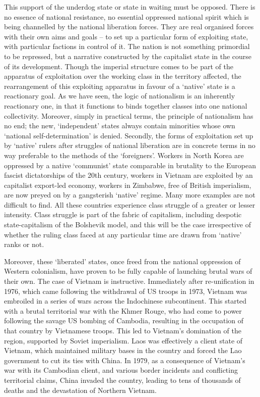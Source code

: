 This support of the underdog state or state in waiting must be opposed. There is no essence of national resistance, no essential oppressed national spirit which is being channelled by the national liberation forces. They are real organised forces with their own aims and goals – to set up a particular form of exploiting state, with particular factions in control of it. The nation is not something primordial to be repressed, but a narrative constructed by the capitalist state in the course of its development. Though the imperial structure comes to be part of the apparatus of exploitation over the working class in the territory affected, the rearrangement of this exploiting apparatus in favour of a ‘native’ state is a reactionary goal. As we have seen, the logic of nationalism is an inherently reactionary one, in that it functions to binds together classes into one national collectivity. Moreover, simply in practical terms, the principle of nationalism has no end; the new, ‘independent’ states always contain minorities whose own ‘national self-determination’ is denied. Secondly, the forms of exploitation set up by ‘native’ rulers after struggles of national liberation are in concrete terms in no way preferable to the methods of the ‘foreigners’. Workers in North Korea are oppressed by a native ‘communist’ state comparable in brutality to the European fascist dictatorships of the 20th century, workers in Vietnam are exploited by an capitalist export-led economy, workers in Zimbabwe, free of British imperialism, are now preyed on by a gangsterish ‘native’ regime. Many more examples are not difficult to find. All these countries experience class struggle of a greater or lesser intensity. Class struggle is part of the fabric of capitalism, including despotic state-capitalism of the Bolshevik model, and this will be the case irrespective of whether the ruling class faced at any particular time are drawn from ‘native’ ranks or not.

Moreover, these ‘liberated’ states, once freed from the national oppression of Western colonialism, have proven to be fully capable of launching brutal wars of their own. The case of Vietnam is instructive. Immediately after re-unification in 1976, which came following the withdrawal of US troops in 1973, Vietnam was embroiled in a series of wars across the Indochinese subcontinent. This started with a brutal territorial war with the Khmer Rouge, who had come to power following the savage US bombing of Cambodia, resulting in the occupation of that country by Vietnamese troops. This led to Vietnam’s domination of the region, supported by Soviet imperialism. Laos was effectively a client state of Vietnam, which maintained military bases in the country and forced the Lao government to cut its ties with China. In 1979, as a consequence of Vietnam’s war with its Cambodian client, and various border incidents and conflicting territorial claims, China invaded the country, leading to tens of thousands of deaths and the devastation of Northern Vietnam.

